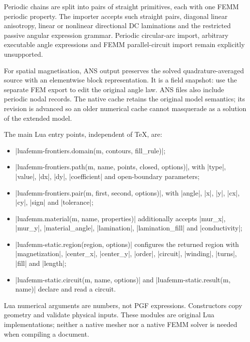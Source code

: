 Periodic chains are split into pairs of straight primitives, each with one FEMM
periodic property. The importer accepts such straight pairs, diagonal linear
anisotropy, linear or nonlinear directional DC laminations and the restricted passive angular
expression grammar. Periodic circular-arc import, arbitrary executable angle
expressions and FEMM parallel-circuit import remain explicitly unsupported.

For spatial magnetisation, ANS output preserves the solved quadrature-averaged
source with an elementwise block representation. It is a field snapshot: use
the separate FEM export to edit the original angle law. ANS files also include
periodic nodal records. The native cache retains the original model semantics;
its revision is advanced so an older numerical cache cannot masquerade as a
solution of the extended model.

The main Lua entry points, independent of TeX, are:
\begin{itemize}
\item |luafemm-frontiers.domain(m, contours, fill_rule)|;
\item |luafemm-frontiers.path(m, name, points, closed, options)|, with
  |type|, |value|, |dx|, |dy|, |coefficient| and open-boundary parameters;
\item |luafemm-frontiers.pair(m, first, second, options)|, with
  |angle|, |x|, |y|, |cx|, |cy|, |sign| and |tolerance|;
\item |luafemm.material(m, name, properties)| additionally accepts
  |mur_x|, |mur_y|, |material_angle|, |lamination|, |lamination_fill| and
  |conductivity|;
\item |luafemm-static.region(region, options)| configures the returned region
  with |magnetization|, |center_x|, |center_y|, |order|, |circuit|, |winding|,
  |turns|, |fill| and |length|;
\item |luafemm-static.circuit(m, name, options)| and
  |luafemm-static.result(m, name)| declare and read a circuit.
\end{itemize}
Lua numerical arguments are numbers, not PGF expressions. Constructors copy
geometry and validate physical inputs. These modules are original Lua
implementations; neither a native mesher nor a native FEMM solver is needed
when compiling a document.
